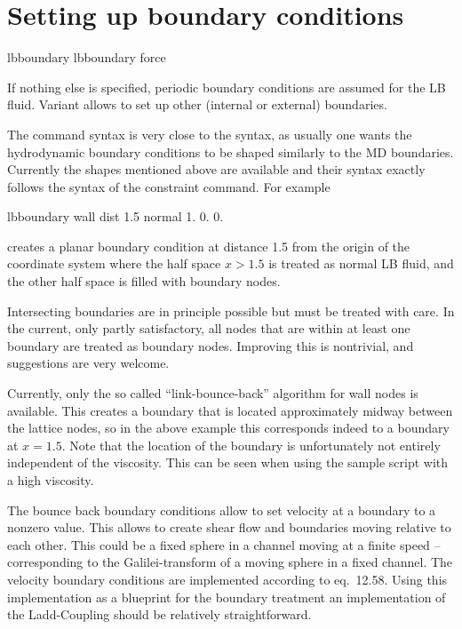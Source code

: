 \section{Setting up boundary conditions}
\begin{essyntax}
   lbboundary   
   lbboundary force 
  \begin{features}
  \end{features}
\end{essyntax}

If nothing else is specified, periodic boundary conditions are assumed
for the LB fluid. Variant  allows to set up other (internal
or external) boundaries.

The  command syntax is very close to the
 syntax, as usually one wants the hydrodynamic
boundary conditions to be shaped similarly to the MD
boundaries. Currently the shapes mentioned above are available and
their syntax exactly follows the syntax of the constraint command. For
example
\begin{tclcode}
  lbboundary wall dist 1.5 normal 1. 0. 0. 
\end{tclcode}
creates a planar boundary condition at distance 1.5 from the origin of
the coordinate system where the half space $x>1.5$ is treated as
normal LB fluid, and the other half space is filled with boundary
nodes.

Intersecting boundaries are in principle possible but must be treated
with care. 
In the current, only partly satisfactory, all nodes that are within at least
one boundary are treated as boundary nodes. Improving this is nontrivial, 
and suggestions are very welcome.

Currently, only the so called ``link-bounce-back'' algorithm for wall
nodes is available. This creates a boundary that is located
approximately midway between the lattice nodes, so in the above
example this corresponds indeed to a boundary at $x=1.5$. Note that
the location of the boundary is unfortunately not entirely independent of the
viscosity. This can \eg be seen when using the sample script
 with a high viscosity.

The bounce back boundary conditions allow to set velocity at a boundary to a nonzero
value. This allows to create shear flow and boundaries moving relative to 
each other. This could be a fixed sphere in a channel moving at a finite speed -- 
corresponding to the Galilei-transform of a moving sphere in a fixed channel.
The velocity boundary conditions are implemented according to \cite{succi01a}
eq.~12.58. Using this implementation as a blueprint for the boundary treatment 
an implementation of the Ladd-Coupling should be relatively straightforward.

